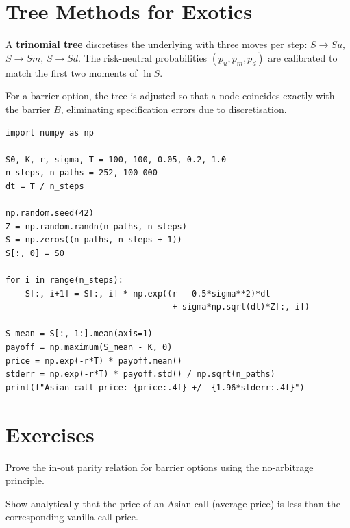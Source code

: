 \section{Tree Methods for Exotics}

\begin{definition}
A \textbf{trinomial tree} discretises the underlying with three moves per step:
$S \to Su$, $S \to Sm$, $S \to Sd$. The risk-neutral probabilities
$(p_u, p_m, p_d)$ are calibrated to match the first two moments of $\ln S$.
\end{definition}

\begin{proposition}
For a barrier option, the tree is adjusted so that a node coincides exactly
with the barrier $B$, eliminating specification errors due to discretisation.
\end{proposition}

\begin{codeblock}[title=\textbf{Asian option pricing by Monte Carlo}]
\begin{verbatim}
import numpy as np

S0, K, r, sigma, T = 100, 100, 0.05, 0.2, 1.0
n_steps, n_paths = 252, 100_000
dt = T / n_steps

np.random.seed(42)
Z = np.random.randn(n_paths, n_steps)
S = np.zeros((n_paths, n_steps + 1))
S[:, 0] = S0

for i in range(n_steps):
    S[:, i+1] = S[:, i] * np.exp((r - 0.5*sigma**2)*dt
                                  + sigma*np.sqrt(dt)*Z[:, i])

S_mean = S[:, 1:].mean(axis=1)
payoff = np.maximum(S_mean - K, 0)
price = np.exp(-r*T) * payoff.mean()
stderr = np.exp(-r*T) * payoff.std() / np.sqrt(n_paths)
print(f"Asian call price: {price:.4f} +/- {1.96*stderr:.4f}")
\end{verbatim}
\end{codeblock}

\section{Exercises}

\begin{exercise}
Prove the in-out parity relation for barrier options using the no-arbitrage
principle.
\end{exercise}

\begin{exercise}
Show analytically that the price of an Asian call (average price) is less
than the corresponding vanilla call price.
\end{exercise}

